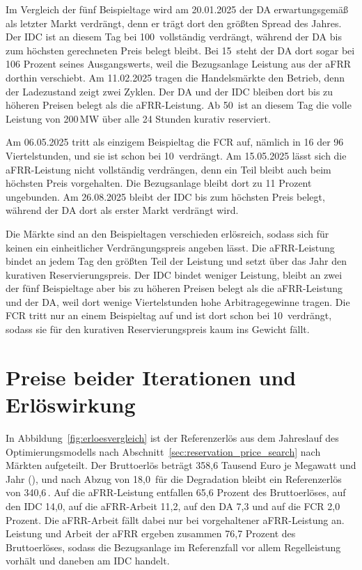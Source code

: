Im Vergleich der fünf Beispieltage wird am 20.01.2025 der \ac{DA} erwartungsgemäß als letzter Markt verdrängt, denn er trägt dort den größten Spread des Jahres.
Der \ac{IDC} ist an diesem Tag bei 100\,\EurMWh{} vollständig verdrängt, während der \ac{DA} bis zum höchsten gerechneten Preis belegt bleibt.
Bei 15\,\EurMWh{} steht der \ac{DA} dort sogar bei 106 Prozent seines Ausgangswerts, weil die Bezugsanlage Leistung aus der \ac{aFRR} dorthin verschiebt.
Am 11.02.2025 tragen die Handelsmärkte den Betrieb, denn der Ladezustand zeigt zwei Zyklen.
Der \ac{DA} und der \ac{IDC} bleiben dort bis zu höheren Preisen belegt als die \ac{aFRR}-Leistung.
Ab 50\,\EurMWh{} ist an diesem Tag die volle Leistung von 200\,\si{MW} über alle 24 Stunden kurativ reserviert.

Am 06.05.2025 tritt als einzigem Beispieltag die \ac{FCR} auf, nämlich in 16 der 96 Viertelstunden, und sie ist schon bei 10\,\EurMWh{} verdrängt.
Am 15.05.2025 lässt sich die \ac{aFRR}-Leistung nicht vollständig verdrängen, denn ein Teil bleibt auch beim höchsten Preis vorgehalten.
Die Bezugsanlage bleibt dort zu 11 Prozent ungebunden.
Am 26.08.2025 bleibt der \ac{IDC} bis zum höchsten Preis belegt, während der \ac{DA} dort als erster Markt verdrängt wird.

Die Märkte sind an den Beispieltagen verschieden erlösreich, sodass sich für keinen ein einheitlicher Verdrängungspreis angeben lässt.
Die \ac{aFRR}-Leistung bindet an jedem Tag den größten Teil der Leistung und setzt über das Jahr den kurativen Reservierungspreis.
Der \ac{IDC} bindet weniger Leistung, bleibt an zwei der fünf Beispieltage aber bis zu höheren Preisen belegt als die \ac{aFRR}-Leistung und der \ac{DA}, weil dort wenige Viertelstunden hohe Arbitragegewinne tragen.
Die \ac{FCR} tritt nur an einem Beispieltag auf und ist dort schon bei 10\,\EurMWh{} verdrängt, sodass sie für den kurativen Reservierungspreis kaum ins Gewicht fällt.

\section{Preise beider Iterationen und Erlöswirkung}
\label{sec:iteration_prices}

In Abbildung~\ref{fig:erloesvergleich} ist der Referenzerlös aus dem Jahreslauf des Optimierungsmodells nach Abschnitt~\ref{sec:reservation_price_search} nach Märkten aufgeteilt.
Der Bruttoerlös beträgt 358,6 Tausend Euro je Megawatt und Jahr (\TsdEurMWa{}), und nach Abzug von 18,0\,\TsdEurMWa{} für die Degradation bleibt ein Referenzerlös von 340,6\,\TsdEurMWa{}.
Auf die \ac{aFRR}-Leistung entfallen 65,6 Prozent des Bruttoerlöses, auf den \ac{IDC} 14,0, auf die \ac{aFRR}-Arbeit 11,2, auf den \ac{DA} 7,3 und auf die \ac{FCR} 2,0 Prozent.
Die \ac{aFRR}-Arbeit fällt dabei nur bei vorgehaltener \ac{aFRR}-Leistung an.
Leistung und Arbeit der \ac{aFRR} ergeben zusammen 76,7 Prozent des Bruttoerlöses, sodass die Bezugsanlage im Referenzfall vor allem Regelleistung vorhält und daneben am \ac{IDC} handelt.

